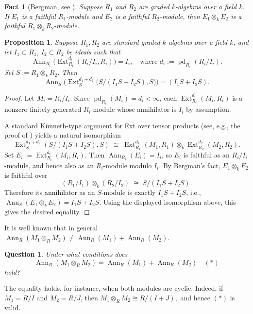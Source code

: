 \documentclass[11pt,a4paper]{amsart}
\numberwithin{equation}{section}
\newtheorem{proposition}[theorem]{Proposition}
\newtheorem{fact}[theorem]{Fact}
\newtheorem{question}[theorem]{Question}
\DeclareMathOperator{\Ann}{Ann}\DeclareMathOperator{\ann}{Ann}
\DeclareMathOperator{\pd}{pd}
\DeclareMathOperator{\Ext}{Ext}
\begin{document}
\begin{fact}[Bergman, see \cite{berg}]
	Suppose $R_1$ and $R_2$ are graded $k$-algebras over a field $k$.
	If $E_1$ is a faithful $R_1$-module and $E_2$ is a faithful $R_2$-module, then
	\(
	E_1 \otimes_k E_2
	\)
	is a faithful $R_1 \otimes_k R_2$-module.
\end{fact}

\begin{proposition}\label{pt}
	Suppose $R_1, R_2$ are standard graded $k$-algebras over a field $k$, and let
	$I_1 \subset R_1$, $I_2 \subset R_2$ be ideals such that
	\[
	\Ann_{R_i}\!\big(\Ext^{d_i}_{R_i}(R_i/I_i,R_i)\big)= I_i,
	\quad \text{where } d_i:=\pd_{R_i}(R_i/I_i).
	\]
	Set $S := R_1 \otimes_k R_2$. Then
	\[
	\Ann_S\!\Big(
	\Ext^{d_1+d_2}_S\big(S/(I_1S+I_2S),S\big)
	\Big)
	= (I_1S+I_2S).
	\]
\end{proposition}

\begin{proof}
	Let $M_i = R_i/I_i$. Since $\pd_{R_i}(M_i)=d_i<\infty$, each $\Ext^{d_i}_{R_i}(M_i,R_i)$ is a nonzero finitely generated $R_i$-module whose annihilator is $I_i$ by assumption.
	
	A standard Künneth-type argument for Ext over tensor products (see, e.g., the proof of \cite[4.2]{HHS}) yields a natural isomorphism
	\[
	\Ext^{d_1+d_2}_S(S/(I_1S+I_2S),S)
	\;\cong\;
	\Ext^{d_1}_{R_1}(M_1,R_1)\otimes_k
	\Ext^{d_2}_{R_2}(M_2,R_2).
	\]
	Set $E_i:=\Ext^{d_i}_{R_i}(M_i,R_i)$. Then $\Ann_{R_i}(E_i)=I_i$, so $E_i$ is faithful as an $R_i/I_i$-module, and hence also as an $R_i$-module modulo $I_i$.
	By Bergman’s fact, $E_1\otimes_k E_2$ is faithful over
	\[
	(R_1/I_1)\otimes_k (R_2/I_2)
	\;\cong\;
	S/(I_1S+I_2S).
	\]
	Therefore its annihilator as an $S$-module is exactly $I_1S+I_2S$, i.e.,
	\(
	\Ann_S(E_1\otimes_k E_2)=I_1S+I_2S.
	\)
	Using the displayed isomorphism above, this gives the desired equality.
\end{proof}

It is well known that in general
\(
\Ann_R(M_1 \otimes_R M_2)\neq \Ann_R(M_1)+\Ann_R(M_2).
\)

\begin{question}\label{qat}
	Under what conditions does
	\[
	\Ann_R(M_1 \otimes_R M_2)=\Ann_R(M_1)+\Ann_R(M_2)\quad(\ast)
	\]
	hold?
\end{question}

The equality holds, for instance, when both modules are cyclic. Indeed, if
$M_1 = R/I$ and $M_2 = R/J$, then
\(
M_1 \otimes_R M_2 \cong R/(I+J),
\)
and hence
$(\ast)$ is valid.
\end{document}
